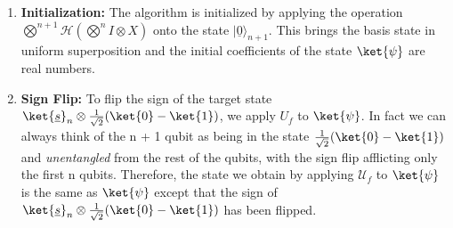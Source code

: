 \documentclass[english]{article}
\begin{document}
				\begin{enumerate}
					\item \textbf{Initialization:}
					The algorithm is initialized by applying the operation $\bigotimes^{n+1}\mathcal{H}(\bigotimes^n I\otimes X)$ onto the state $|\underline{0}\rangle_{n+1}$. This brings the basis state in uniform superposition and the initial coefficients of the state $\ket{\psi}$ are real numbers. 
					
					\item \textbf{Sign Flip:}
					To flip the sign of the target state $\ket{\underline{s}}_n \otimes \frac{1}{\sqrt{2}}(\ket{0}-\ket{1})$, we apply $U_f$ to $\ket{\psi}$. In fact we can always think of the n + 1 qubit as being in the state $\frac{1}{\sqrt{2}}(\ket{0}-\ket{1})$ and \emph{unentangled} from the rest of the qubits, with the sign flip afflicting only the first n qubits. Therefore, the state we obtain by applying $\mathcal{U}_f$ to $\ket{\psi}$ is the same as $\ket{\psi}$ except that the sign of $\ket{\underline{s}}_n \otimes \frac{1}{\sqrt{2}}(\ket{0}-\ket{1})$ has been flipped.
					

\end{enumerate}
\end{document}
